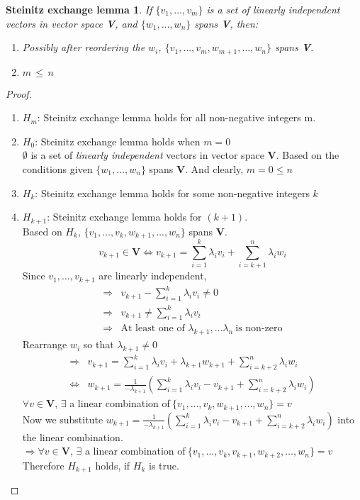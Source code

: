 \documentclass{article}
\newtheorem*{thm}
{Steinitz exchange lemma}
\theoremstyle{definition}\newtheorem{definition}{Definition}
\begin{document}
	\begin{thm}
	If $\{v_1,\ldots,v_m\}$ is a set of \emph{linearly independent} vectors in vector space \textbf{V}, and $\{w_1,\ldots,w_n\}$ spans \textbf{V}, then:
		\begin{enumerate}
			\item{Possibly after reordering the $w_i$, $\{v_1,\ldots,v_m,w_{m+1},\ldots,w_n\}$ spans \textbf{V}.}
			\item{$m\,\leq\,n$}
		\end{enumerate}

	\end{thm}

	\begin{proof}\
		\begin{enumerate}
			\item $H_m$: Steinitz exchange lemma holds for all non-negative integers m.
			\item $H_0$: Steinitz exchange lemma holds when $m=0$\\
			$\emptyset$ is a set of \emph{linearly independent} vectors in vector space \textbf{V}. Based on the conditions given $\{w_1,\ldots,w_n\}$ spans \textbf{V}. And clearly, $m=0\leq n$
			\item $H_k$: Steinitz exchange lemma holds for some non-negative integers $k$
			\item $H_{k+1}$: Steinitz exchange lemma holds for $(k+1)$.\\
			Based on $H_k$, $\{v_1,\ldots,v_k,w_{k+1},\ldots,w_n\}$ spans \textbf{V}.
			$$
				v_{k+1}\in \textbf{V}\Leftrightarrow v_{k+1}=\sum_{i=1}^k{\lambda_i v_i}+\sum_{i=k+1}^n{\lambda_i w_i}
			$$
				Since $v_1,\ldots,v_{k+1}$ are linearly independent,
				\begin{align*}
					\Rightarrow &v_{k+1}-\sum_{i=1}^k{\lambda_i v_i}\neq0\\
					\Rightarrow &v_{k+1}\neq\sum_{i=1}^k{\lambda_i v_i}\\
					\Rightarrow &\text{At least one of }\lambda_{k+1},\ldots\lambda_n~\text{is non-zero}
				\end{align*}
				Rearrange $w_i$ so that $\lambda_{k+1}\neq0$
				\begin{align*}
					\Rightarrow &v_{k+1}=\sum_{i=1}^k{\lambda_i v_i}+\lambda_{k+1}w_{k+1}+\sum_{i=k+2}^n{\lambda_i w_i}\\
					\Leftrightarrow &w_{k+1}=\frac{1}{-\lambda_{k+1}}(\sum_{i=1}^k{\lambda_i v_i}-v_{k+1}+\sum_{i=k+2}^n{\lambda_i w_i})
				\end{align*}
				$\forall v\in$\textbf{V}, $\exists$ a linear combination of$~\{v_1,\ldots,v_k,w_{k+1},\ldots,w_n\}=v$\\
				Now we substitute $w_{k+1}=\frac{1}{-\lambda_{k+1}}(\sum_{i=1}^k{\lambda_i v_i}-v_{k+1}+\sum_{i=k+2}^n{\lambda_i w_i})$ into the  linear combination.\\
				$\Rightarrow\forall v\in$\textbf{V}, $\exists$ a linear combination of$~\{v_1,\ldots,v_k,v_{k+1},w_{k+2},\ldots,w_n\}=v$\\
				Therefore $H_{k+1}$ holds, if $H_k$ is true.
				

\end{enumerate}
\end{proof}
\end{document}
